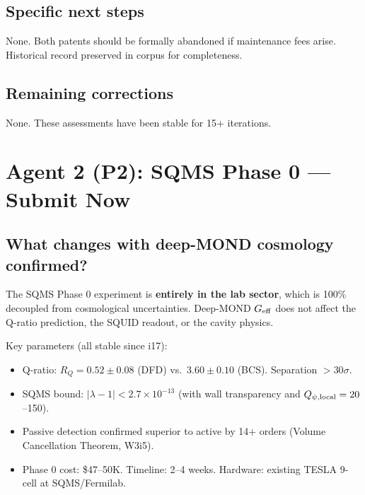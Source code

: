\documentclass[11pt]{article}
\begin{document}
\subsection{Specific next steps}
None. Both patents should be formally abandoned if maintenance fees arise.
Historical record preserved in corpus for completeness.

\subsection{Remaining corrections}
None. These assessments have been stable for 15+ iterations.

\newpage
\section{Agent 2 (P2): SQMS Phase 0 --- Submit Now}
\label{sec:agent2}

\subsection{What changes with deep-MOND cosmology confirmed?}

The SQMS Phase 0 experiment is \textbf{entirely in the lab sector}, which is
100\% decoupled from cosmological uncertainties. Deep-MOND $G_{\rm eff}$ does
not affect the Q-ratio prediction, the SQUID readout, or the cavity physics.

Key parameters (all stable since i17):
\begin{itemize}
\item Q-ratio: $R_Q = 0.52 \pm 0.08$ (DFD) vs.\ $3.60 \pm 0.10$ (BCS). Separation $>30\sigma$.
\item SQMS bound: $|\lambda - 1| < 2.7 \times 10^{-13}$ (with wall transparency and $Q_{\psi,\rm local} = 20$--150).
\item Passive detection confirmed superior to active by 14+ orders (Volume Cancellation Theorem, W3i5).
\item Phase 0 cost: \$47--50K. Timeline: 2--4 weeks. Hardware: existing TESLA 9-cell at SQMS/Fermilab.
\end{itemize}
\end{document}
